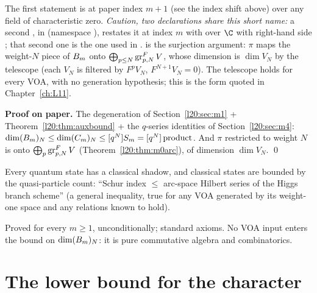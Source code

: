 \begin{dictionary}
The first statement is at paper index $m+1$ (see the index shift above) over any field of characteristic zero.
\emph{Caution, two declarations share this short name:} a second , in
 (namespace ), restates it at index
$m$ with  over $\C$ with right-hand side ; that second one is the
one used in .  is the surjection argument: $\pi$ maps the weight-$N$ piece of
$B_m$ onto $\bigoplus_{p\le N}\operatorname{gr}^F_{p,N}V$, whose dimension is $\dim V_N$ by the telescope
 (each $V_N$ is filtered by $F^pV_N$, $F^{N+1}V_N=0$). The telescope holds
for every VOA, with no generation hypothesis; this is the form quoted in Chapter~\ref{ch:L11}.
\end{dictionary}

\textbf{Proof on paper.} The degeneration of Section~\ref{l20:sec:m1} + Theorem~\ref{l20:thm:auxbound} + the $q$-series identities of Section~\ref{l20:sec:m4}: $\dim(B_m)_N\le\dim(C_m)_N\le[q^N]S_m=[q^N]\,
\mathrm{product}$. And $\pi$ restricted to weight $N$ is onto $\bigoplus_p\operatorname{gr}^F_{p,N}V$ (Theorem~\ref{l20:thm:m0arc}),
of dimension $\dim V_N$. \qed

\begin{physics}
Every quantum state has a classical shadow, and classical states are bounded by the quasi-particle count:
``Schur index $\le$ arc-space Hilbert series of the Higgs branch scheme'' (a general inequality, true for any VOA
generated by its weight-one space and any relations known to hold).
\end{physics}

\begin{status}
Proved for every $m\ge1$, unconditionally; standard axioms. No VOA input enters the bound on $\dim(B_m)_N$:
it is pure commutative algebra and combinatorics.
\end{status}

\section{The lower bound for the character}\label{l20:sec:m6}

